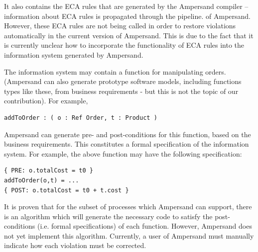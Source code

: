 \documentclass[12pt]{report}
\begin{document}
It also contains the ECA rules that are generated by the Ampersand compiler --
information about ECA rules is propagated
through the pipeline. 
of
Ampersand. However, these ECA rules are not being called in order to restore
violations automatically in the current version of Ampersand. This is due to the
fact that it is currently unclear how to incorporate the functionality of ECA
rules into the information system generated by Ampersand. 

The information system may contain a function for manipulating orders. 
(Ampersand can also generate
prototype software models, including functions types like these, from business
requirements - but this is not the topic of our contribution). For example,

\begin{verbatim}
addToOrder : ( o : Ref Order, t : Product )
\end{verbatim}

Ampersand can generate pre- and post-conditions for this function, based on the
business requirements. This constitutes a formal specification of the
information system. For example, the above function may have the following 
specification:

\begin{verbatim}
{ PRE: o.totalCost = t0 } 
addToOrder(o,t) = ...
{ POST: o.totalCost = t0 + t.cost } 
\end{verbatim}

It is proven  
%
%
that for the subset of processes which Ampersand can support, there is an
algorithm which will generate the necessary code to satisfy the post-conditions
(i.e. 
formal specifications) of each function. However, Ampersand does not yet
implement this algorithm. Currently, a user of Ampersand must manually indicate
how each violation must be corrected.
\end{document}
